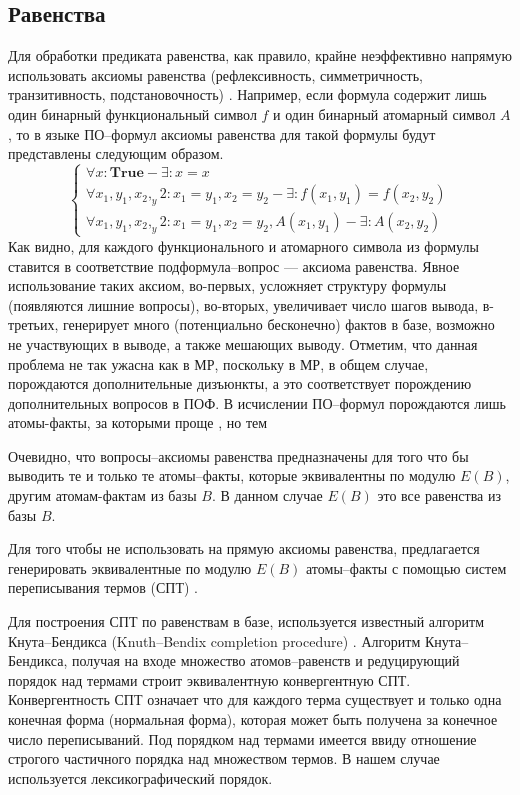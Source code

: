 \subsection{Равенства}
Для обработки предиката равенства, как правило, крайне неэффективно напрямую использовать аксиомы равенства (рефлексивность, симметричность, транзитивность, подстановочность) . Например, если формула содержит лишь один бинарный функциональный символ $f$ и один бинарный атомарный символ $A$, то в языке ПО--формул аксиомы равенства для такой формулы будут представлены следующим образом.
$$\left\lbrace
\begin{array}{l}
\forall x\colon\boldsymbol{True} - \exists\colon x = x \\
\forall x_1,y_1,x_2,_y2\colon x_1 = y_1, x_2 = y_2 - \exists\colon f(x_1,y_1) = f(x_2, y_2) \\
\forall x_1,y_1,x_2,_y2\colon x_1 = y_1, x_2 = y_2, A(x_1,y_1) - \exists\colon A(x_2,y_2)
\end{array}\right.
$$
Как видно, для каждого функционального и атомарного символа из формулы ставится в соответствие подформула--вопрос --- аксиома равенства. Явное использование таких аксиом, во-первых, усложняет структуру формулы (появляются лишние вопросы), во-вторых,  увеличивает число шагов вывода, в-третьих, генерирует много (потенциально бесконечно) фактов в базе, возможно не участвующих в выводе, а также мешающих выводу. Отметим, что данная проблема не так ужасна как в МР, поскольку в МР, в общем случае,  порождаются дополнительные дизъюнкты, а это соответствует порождению дополнительных вопросов в ПОФ. В исчислении ПО--формул порождаются лишь атомы-факты, за которыми проще , но тем 

Очевидно, что вопросы--аксиомы равенства предназначены для того что бы выводить те и только те атомы--факты, которые эквивалентны по модулю $E(B)$, другим атомам-фактам из базы $B$. В данном случае $E(B)$ это все равенства из базы $B$.

Для того чтобы не использовать на прямую аксиомы равенства, предлагается генерировать эквивалентные по модулю $E(B)$ атомы--факты с помощью систем переписывания термов (СПТ) \cite{Nipkow}.

Для построения СПТ по равенствам в базе, используется известный алгоритм Кнута--Бендикса (Knuth--Bendix completion procedure) \cite{KBAlg}. Алгоритм Кнута--Бендикса, получая на входе множество атомов--равенств и редуцирующий порядок над термами \cite{Nipkow} строит эквивалентную конвергентную СПТ. Конвергентность СПТ означает что для каждого терма существует и только одна конечная форма (нормальная форма), которая может быть получена за конечное число переписываний. Под порядком над термами имеется ввиду отношение строгого частичного порядка над множеством термов. В нашем случае используется лексикографический порядок.

